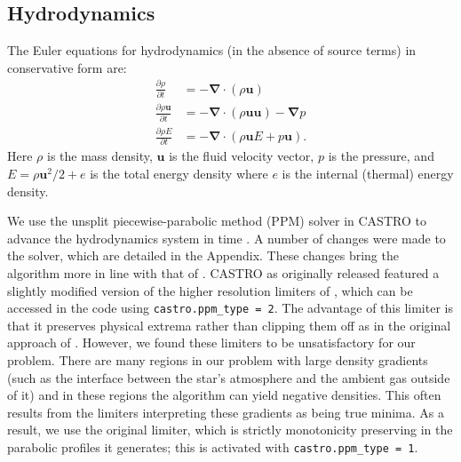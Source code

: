 \documentclass[12pt,preprint]{aastex}
\begin{document}
\subsection{Hydrodynamics}

The Euler equations for hydrodynamics (in the absence of source terms) in conservative form are:
\begin{align}
  \frac{\partial \rho}{\partial t} &= -\bm{\nabla} \cdot (\rho \mathbf{u}) \\
  \frac{\partial \rho \mathbf{u}}{\partial t} &= -\bm{\nabla} \cdot (\rho \mathbf{u}\mathbf{u}) - \bm{\nabla}p \\
  \frac{\partial \rho E}{\partial t} &= -\bm{\nabla}\cdot(\rho\mathbf{u}E + p\mathbf{u}).
\end{align}
Here $\rho$ is the mass density, $\mathbf{u}$ is the fluid velocity vector, $p$ is the pressure, and $E = \rho \mathbf{u}^2 / 2 + e$ is the total energy density where $e$ is the internal (thermal) energy density.

We use the unsplit piecewise-parabolic method (PPM) solver in CASTRO to advance the hydrodynamics system in time \citep{ppmunsplit}.  A number of changes were made to the solver, which are detailed in the Appendix.  These changes bring the algorithm more in line with that of \cite{ppm}. CASTRO as originally released featured a slightly modified version of the higher resolution limiters of \cite{colella_sekora:2008}, which can be accessed in the code using \texttt{castro.ppm\_type = 2}. The advantage of this limiter is that it preserves physical extrema rather than clipping them off as in the original approach of \cite{ppm}. However, we found these limiters to be unsatisfactory for our problem. There are many regions in our problem with large density gradients (such as the interface between the star's atmosphere and the ambient gas outside of it) and in these regions the algorithm can yield negative densities. This often results from the limiters interpreting these gradients as being true minima. As a result, we use the original limiter, which is strictly monotonicity preserving in the parabolic profiles it generates; this is activated with \texttt{castro.ppm\_type = 1}.
\end{document}

